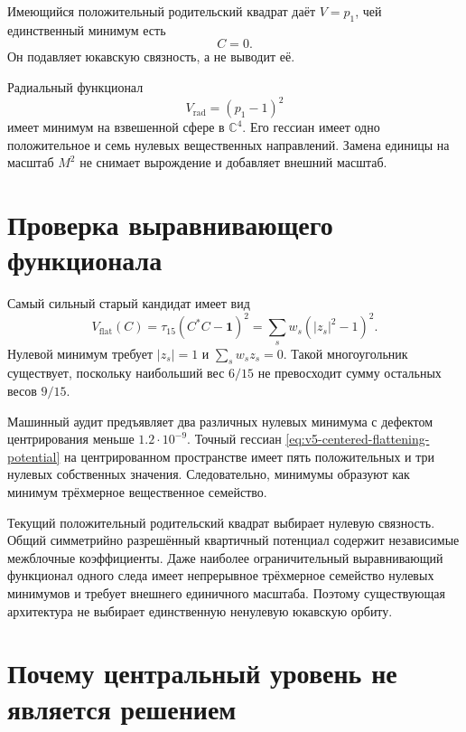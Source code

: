 Имеющийся положительный родительский квадрат даёт \(V=p_1\), чей
единственный минимум есть
\begin{equation}
 C=0.
\end{equation}
Он подавляет юкавскую связность, а не выводит её.

Радиальный функционал
\begin{equation}
 V_{\mathrm{rad}}=(p_1-1)^2
\end{equation}
имеет минимум на взвешенной сфере в \(\mathbb C^4\). Его гессиан имеет одно
положительное и семь нулевых вещественных направлений. Замена единицы на
масштаб \(M^2\) не снимает вырождение и добавляет внешний масштаб.

\section{Проверка выравнивающего функционала}

Самый сильный старый кандидат имеет вид
\begin{equation}
 V_{\mathrm{flat}}(C)
 =\tau_{15}\!\left(C^*C-\mathbf1\right)^2
 =\sum_s w_s\left(|z_s|^2-1\right)^2.
 \label{eq:v5-centered-flattening-potential}
\end{equation}
Нулевой минимум требует \(|z_s|=1\) и
\(\sum_sw_sz_s=0\). Такой многоугольник существует, поскольку наибольший
вес \(6/15\) не превосходит сумму остальных весов \(9/15\).

Машинный аудит предъявляет два различных нулевых минимума с дефектом
центрирования меньше \(1.2\cdot10^{-9}\). Точный гессиан
\eqref{eq:v5-centered-flattening-potential} на центрированном пространстве
имеет пять положительных и три нулевых собственных значения. Следовательно,
минимумы образуют как минимум трёхмерное вещественное семейство.

\begin{theorem}
Текущий положительный родительский квадрат выбирает нулевую связность.
Общий симметрийно разрешённый квартичный потенциал содержит независимые
межблочные коэффициенты. Даже наиболее ограничительный выравнивающий
функционал одного следа имеет непрерывное трёхмерное семейство нулевых
минимумов и требует внешнего единичного масштаба. Поэтому существующая
архитектура не выбирает единственную ненулевую юкавскую орбиту.
\end{theorem}

\section{Почему центральный уровень не является решением}

